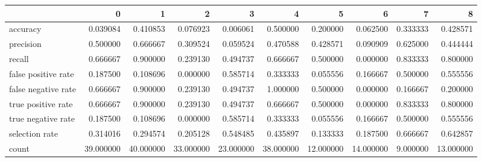 \begin{tabular}{lrrrrrrrrr}
\toprule
{} &          0 &          1 &          2 &          3 &          4 &          5 &          6 &         7 &          8 \\
\midrule
accuracy            &   0.039084 &   0.410853 &   0.076923 &   0.006061 &   0.500000 &   0.200000 &   0.062500 &  0.333333 &   0.428571 \\
precision           &   0.500000 &   0.666667 &   0.309524 &   0.059524 &   0.470588 &   0.428571 &   0.090909 &  0.625000 &   0.444444 \\
recall              &   0.666667 &   0.900000 &   0.239130 &   0.494737 &   0.666667 &   0.500000 &   0.000000 &  0.833333 &   0.800000 \\
false positive rate &   0.187500 &   0.108696 &   0.000000 &   0.585714 &   0.333333 &   0.055556 &   0.166667 &  0.500000 &   0.555556 \\
false negative rate &   0.666667 &   0.900000 &   0.239130 &   0.494737 &   1.000000 &   0.500000 &   0.000000 &  0.166667 &   0.200000 \\
true positive rate  &   0.666667 &   0.900000 &   0.239130 &   0.494737 &   0.666667 &   0.500000 &   0.000000 &  0.833333 &   0.800000 \\
true negative rate  &   0.187500 &   0.108696 &   0.000000 &   0.585714 &   0.333333 &   0.055556 &   0.166667 &  0.500000 &   0.555556 \\
selection rate      &   0.314016 &   0.294574 &   0.205128 &   0.548485 &   0.435897 &   0.133333 &   0.187500 &  0.666667 &   0.642857 \\
count               &  39.000000 &  40.000000 &  33.000000 &  23.000000 &  38.000000 &  12.000000 &  14.000000 &  9.000000 &  13.000000 \\
\bottomrule
\end{tabular}
